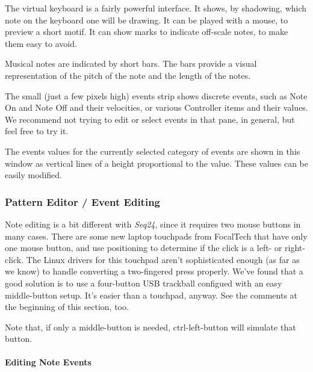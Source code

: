    The virtual keyboard is a fairly powerful interface.  It shows,
   by shadowing, which note on the keyboard one will be drawing. It can be
   played with a mouse, to preview a short motif.
   It can show marks to indicate off-scale notes, to make them easy to
   avoid.

   Musical notes are indicated by short bars.  The bars provide a visual
   representation of the pitch of the note and the length of the notes.

   The small (just a few pixels high) events strip shows discrete events,
   such as Note On and Note Off and their velocities, or various Controller
   items and their values.  We recommend not trying to edit or select events
   in that pane, in general, but feel free to try it.

   The events values for the currently selected category of events are shown
   in this window as vertical lines of a height proportional to the value.
   These values can be easily modified.

\subsubsection{Pattern Editor / Event Editing}
\label{subsubsec:seq24_pattern_editor_event_editing}

   Note editing is a bit different with \textsl{Seq24}, since it
   requires two mouse buttons in many cases.  There are some new
   laptop touchpads from FocalTech that have only one mouse button, and
   use positioning to determine if the click is a left- or right-click.
   The Linux drivers for this touchpad aren't sophisticated enough (as far
   as we know) to handle converting a two-fingered press properly.
   We've found that a good solution is to use a four-button USB trackball
   configued with an easy middle-button setup.
   It's easier than a touchpad, anyway.
   See the comments at the beginning of this section, too.

   Note that, if only a middle-button is needed, ctrl-left-button will
   simulate that button.

\paragraph{Editing Note Events}
\label{paragraph:seq24_pattern_editor_note_events}

